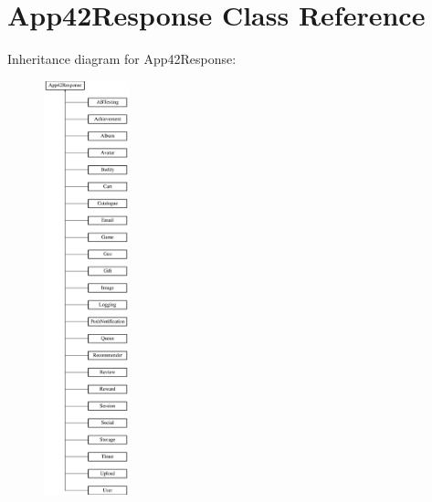 \hypertarget{class_app42_response}{\section{App42\+Response Class Reference}
\label{class_app42_response}
}
Inheritance diagram for App42\+Response\+:\begin{figure}[H]
\begin{center}
\leavevmode
\includegraphics[height=12.000000cm]{class_app42_response}
\end{center}
\end{figure}
